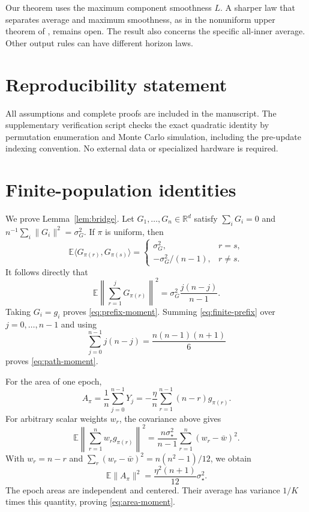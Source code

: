 \documentclass{article}
\theoremstyle{remark}
\newcommand{\E}{\mathbb E}
\newcommand{\R}{\mathbb R}
\newcommand{\1}{\mathbf 1}
\begin{document}
Our theorem uses the maximum component smoothness $L$. A sharper law that separates average and maximum smoothness, as in the nonuniform upper theorem of \citet{liu2026dominates}, remains open. The result also concerns the specific all-inner average. Other output rules can have different horizon laws.

\section*{Reproducibility statement}
All assumptions and complete proofs are included in the manuscript. The supplementary verification script checks the exact quadratic identity by permutation enumeration and Monte Carlo simulation, including the pre-update indexing convention. No external data or specialized hardware is required.




\appendix

\section{Finite-population identities}\label{app:bridge}

We prove Lemma~\ref{lem:bridge}. Let $G_1,\ldots,G_n\in\R^d$ satisfy $\sum_iG_i=0$ and $n^{-1}\sum_i\|G_i\|^2=\sigma_G^2$. If $\pi$ is uniform, then \[ \E\langle G_{\pi(r)},G_{\pi(s)}\rangle
 =\begin{cases}
 \sigma_G^2,&r=s,\\
 -\sigma_G^2/(n-1),&r\neq s.
 \end{cases}
\] It follows directly that
\begin{equation}
 \E\left\|\sum_{r=1}^jG_{\pi(r)}\right\|^2
 =\sigma_G^2\frac{j(n-j)}{n-1}.                       \label{eq:finite-prefix}
\end{equation}
Taking $G_i=g_i$ proves \eqref{eq:prefix-moment}. Summing \eqref{eq:finite-prefix} over $j=0,\ldots,n-1$ and using \[ \sum_{j=0}^{n-1}j(n-j)=\frac{n(n-1)(n+1)}6 \] proves \eqref{eq:path-moment}.

For the area of one epoch, \[ A_\pi=\frac1n\sum_{j=0}^{n-1}Y_j =-\frac\eta n\sum_{r=1}^{n-1}(n-r)g_{\pi(r)}. \] For arbitrary scalar weights $w_r$, the covariance above gives
\begin{equation}
 \E\left\|\sum_{r=1}^nw_rg_{\pi(r)}\right\|^2
 =\frac{n\sigma_\star^2}{n-1}
   \sum_{r=1}^n(w_r-\bar w)^2.                         \label{eq:weighted-fp}
\end{equation}
With $w_r=n-r$ and $\sum_r(w_r-\bar w)^2=n(n^2-1)/12$, we obtain \[ \E\|A_\pi\|^2=\frac{\eta^2(n+1)}{12}\sigma_\star^2. \] The epoch areas are independent and centered. Their average has variance $1/K$ times this quantity, proving \eqref{eq:area-moment}.
\end{document}
